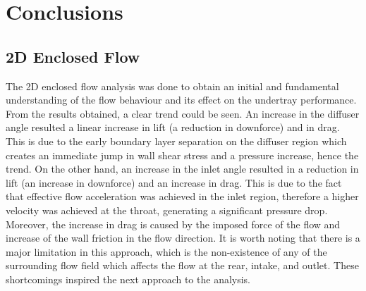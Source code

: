 \section{Conclusions}
\justifying
\subsection{2D Enclosed Flow}
The 2D enclosed flow analysis was done to obtain an initial and fundamental understanding of the flow behaviour and its effect on the undertray performance. From the results obtained, a clear trend could be seen. An increase in the diffuser angle resulted a linear increase in lift (a reduction in downforce) and in drag. This is due to the early boundary layer separation on the diffuser region which creates an immediate jump in wall shear stress and a pressure increase, hence the trend. On the other hand, an increase in the inlet angle resulted in a reduction in lift (an increase in downforce) and an increase in drag. This is due to the fact that effective flow acceleration was achieved in the inlet region, therefore a higher velocity was achieved at the throat, generating a significant pressure drop. Moreover, the increase in drag is caused by the imposed force of the flow and increase of the wall friction in the flow direction. It is worth noting that there is a major limitation in this approach, which is the non-existence of any of the surrounding flow field which affects the flow at the rear, intake, and outlet. These shortcomings inspired the next approach to the analysis.

